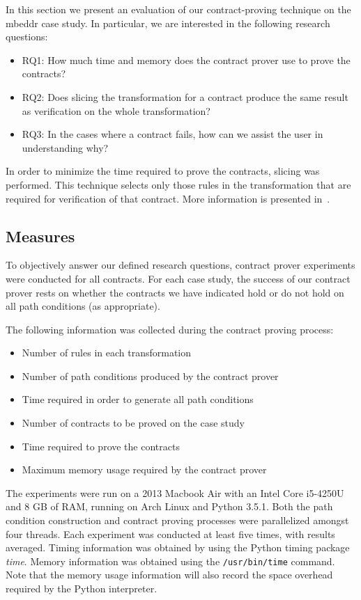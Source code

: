 In this section we present an evaluation of our contract-proving technique on the mbeddr case study. In particular, we are interested in the following
research questions:

\begin{itemize}
\item RQ1: How much time and memory does the contract prover use to prove the contracts?
\item RQ2: Does slicing the transformation for a contract produce the same result as verification on the whole transformation?
\item RQ3: In the cases where a contract fails, how can we assist the user in understanding why?
\end{itemize}

In order to minimize the time required to prove the contracts, slicing was performed. This technique selects only those rules in the transformation that are required for verification of that contract. More information is presented in~\cite{Oakes2016}.

\subsection{Measures}

To objectively answer our defined research questions, contract prover experiments were conducted for all contracts. For each case study, the success of our contract prover rests on whether the contracts we have indicated hold or do not hold on all path conditions (as appropriate).

The following information was collected during the contract proving process:

\begin{itemize}
\item Number of rules in each transformation
\item Number of path conditions produced by the contract prover
\item Time required in order to generate all path conditions
\item Number of contracts to be proved on the case study
\item Time required to prove the contracts
\item Maximum memory usage required by the contract prover
\end{itemize}


The experiments were run on a 2013 Macbook Air with an Intel Core i5-4250U and 8 GB of RAM, running on Arch Linux and Python 3.5.1. Both the path condition construction and contract proving processes were parallelized amongst four threads. Each experiment was conducted at least five times, with results averaged. Timing information was obtained by using the Python timing package \textit{time}. Memory information was obtained using the \texttt{/usr/bin/time} command. Note that the memory usage information will also record the space overhead required by the Python interpreter.

